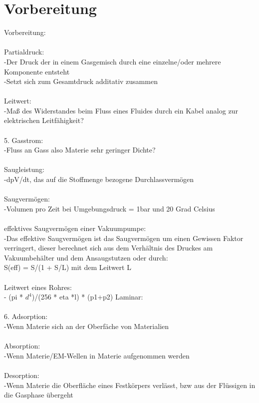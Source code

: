 \section{Vorbereitung}      
Vorbereitung: \\
\\
	   Partialdruck:\\
	   	-Der Druck der in einem Gasgemisch durch eine einzelne/oder mehrere Komponente entsteht\\
		-Setzt sich zum Gesamtdruck additativ zusammen\\
\\
	   Leitwert:\\
		-Maß des Widerstandes beim Fluss eines Fluides durch ein Kabel analog zur elektrischen Leitfähigkeit?\\ 
\\
	5. Gasstrom: \\
		-Fluss an Gass also Materie sehr geringer Dichte?\\
\\
	   Saugleistung:\\
		-dpV/dt, das auf die Stoffmenge bezogene Durchlassvermögen\\
\\
	   Saugvermögen:\\
	   	-Volumen pro Zeit bei Umgebungsdruck = 1bar und 20 Grad Celsius\\
\\
	   effektives Saugvermögen einer Vakuumpumpe:\\
	   	-Das effektive Saugvermögen ist das Saugvermögen um einen Gewissen Faktor verringert, dieser berechnet sich aus dem Verhältnis des Druckes am Vakuumbehälter und dem Ansaugstutzen oder durch:\\
			S(eff) = S/(1 + S/L) mit dem Leitwert L\\
\\
	   Leitwert eines Rohres:\\
		- (pi * $d^4$)/(256 * eta *l) * (p1+p2) Laminar:\\
\\
	6. Adsorption:\\
		-Wenn Materie sich an der Oberfäche von Materialien \\ 
\\
	   Absorption:\\
		-Wenn Materie/EM-Wellen in Materie aufgenommen werden\\
\\
	   Desorption:\\
		-Wenn Materie die Oberfläche eines Festkörpers verlässt, bzw aus der Flüssigen in die Gasphase übergeht\\
